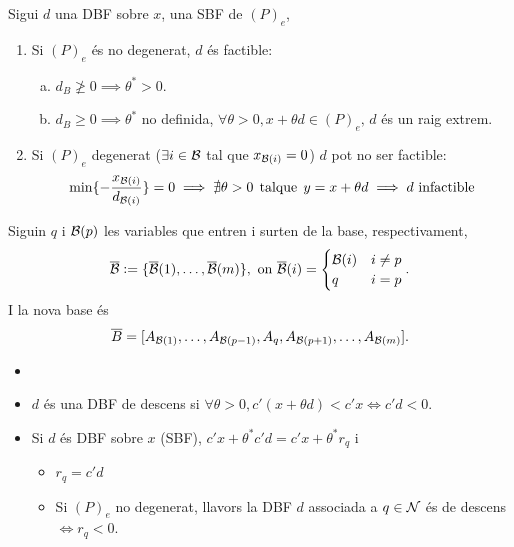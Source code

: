 \begin{prop}
    Sigui $d$ una DBF sobre $x$, una SBF de $(P)_e$,
    \begin{enumerate}
        \item Si $(P)_e$ és no degenerat, $d$ és factible:
            \begin{enumerate}[a)]
                \item $d_B \ngeq 0 \implies \theta^* > 0$.
                \item $d_B \geq 0 \implies \theta^*$ no definida, $\forall \theta > 0, x + \theta d \in (P)_e,\, d$ és un raig extrem.
            \end{enumerate}
        \item Si $(P)_e$ degenerat ($\exists i \in \mathcal{B}$ tal que $x_{\mathcal{B}(i)} = 0$) $d$ pot no ser factible:
            \begin{gather*}
                \min \{ -\frac{x_{\mathcal{B}(i)}}{d_{\mathcal{B}(i)}} \} = 0 \implies \nexists \theta > 0 \operatorname{\;tal que\;} y = x+\theta d \implies d \text{ infactible}
            \end{gather*}
    \end{enumerate}
\end{prop}
\begin{prop}
    Siguin $q$ i $\mathcal{B}(p)$ les variables que entren i surten de la base, respectivament,
    \begin{gather*}
        \overline{\mathcal{B}} := \{ \overline{\mathcal{B}}(1), \dots, \overline{\mathcal{B}}(m) \}, \text{ on } \overline{\mathcal{B}}(i) =
        \begin{cases}
            \mathcal{B}(i) & i \neq p \\
            q & i = p
        \end{cases}.
    \end{gather*}
    I la nova base és
    \[ \overline{B} = [A_{\mathcal{B}(1)}, \dots, A_{\mathcal{B}(p-1)}, A_q, A_{\mathcal{B}(p+1)}, \dots, A_{\mathcal{B}(m)} ]. \]
\end{prop}
\begin{defi}
    \begin{itemize}
        \item[]
        \item $d$ és una DBF de descens si $\forall \theta > 0, c'(x + \theta d) < c'x \iff c'd < 0$.
        \item Si $d$ és DBF sobre $x$ (SBF), $c'x + \theta^*c'd = c'x + \theta^*r_q$ i
            \begin{itemize}
                \item $r_q = c'd$
                \item Si $(P)_e$ no degenerat, llavors la DBF $d$ associada a $q \in \mathcal{N}$ és de descens $\iff r_q < 0$.
            \end{itemize}
    \end{itemize}
\end{defi}
